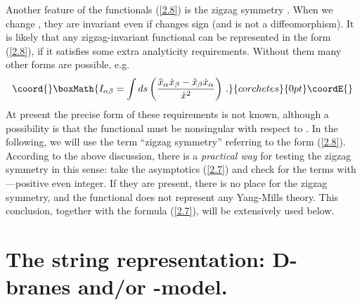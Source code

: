 \documentclass[a4paper,12pt]{article}
\numberwithin{equation}{section}
\begin{document}
Another feature of the functionals (\ref{2.8}) is the zigzag symmetry \cite{1}.
When we change \coordHE{}, they are invariant even if \coordHE{}
changes sign (and is not a diffeomorphism). It is likely that any zigzag-invariant
functional can be represented in the form (\ref{2.8}), if it satisfies some
extra analyticity requirements. Without them many other forms are possible,
e.g.
\[\coord{}\boxMath{
I_{\alpha \beta }=\int ds\left( \frac{\ddot{x}_{\alpha }\dot{x}_{\beta }-\ddot{x}_{\beta }\dot{x}_{\alpha }}{\dot{x}^{2}}\right) \, .}{corchetes}{0pt}\coordE{}\]
 At present the precise form of these requirements is not known, although a
possibility is that the functional must be nonsingular with respect to \coordHE{}.
In the following, we will use the term ``zigzag symmetry'' referring to the
form (\ref{2.8}). According to the above discussion, there is a \emph{practical
way} for testing the zigzag symmetry in this sense: take the asymptotics (\ref{2.7})
and check for the \emph{}terms \emph{\coordHE{}} with \coordHE{}---positive
even integer. If they are present, there is no place for the zigzag symmetry,
and the functional does not represent any Yang-Mills theory. This conclusion,
together with the formula (\ref{2.7}), will be extensively used below.


\section{The string representation: D-branes and/or \protect\myHighlight{\( \sigma \protect \)}\coordHE{}-model.}
\end{document}
